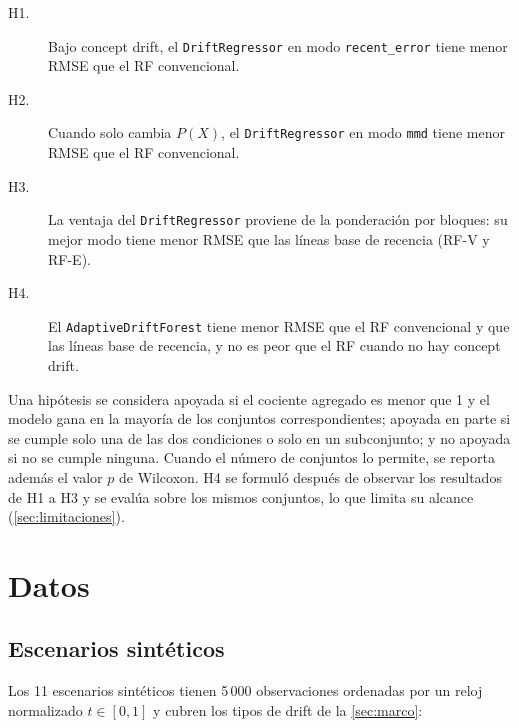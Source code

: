\documentclass[11pt,a4paper]{article}
\begin{document}
\begin{description}
  \item[H1.] Bajo concept drift, el \texttt{DriftRegressor} en modo \texttt{recent\_error} tiene menor
  RMSE que el RF convencional.
  \item[H2.] Cuando solo cambia $P(X)$, el \texttt{DriftRegressor} en modo \texttt{mmd} tiene menor
  RMSE que el RF convencional.
  \item[H3.] La ventaja del \texttt{DriftRegressor} proviene de la ponderación por bloques: su mejor
  modo tiene menor RMSE que las líneas base de recencia (RF-V y RF-E).
  \item[H4.] El \texttt{AdaptiveDriftForest} tiene menor RMSE que el RF convencional y que las líneas
  base de recencia, y no es peor que el RF cuando no hay concept drift.
\end{description}

Una hipótesis se considera apoyada si el cociente agregado es menor que 1 y el modelo gana en la
mayoría de los conjuntos correspondientes; apoyada en parte si se cumple solo una de las dos
condiciones o solo en un subconjunto; y no apoyada si no se cumple ninguna. Cuando el número de
conjuntos lo permite, se reporta además el valor $p$ de Wilcoxon. H4 se formuló después de observar
los resultados de H1 a H3 y se evalúa sobre los mismos conjuntos, lo que limita su alcance
(\cref{sec:limitaciones}).

\section{Datos}\label{sec:datos}

\subsection{Escenarios sintéticos}

Los 11 escenarios sintéticos tienen 5\,000 observaciones ordenadas por un reloj normalizado
$t\in[0,1]$ y cubren los tipos de drift de la \cref{sec:marco}:
\end{document}
